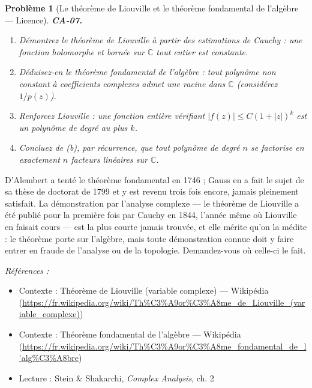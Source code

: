 \documentclass[11pt]{article}
\newtheorem{problem}{Problème}
\newenvironment{refs}{\par\small\noindent\emph{Références :}\begin{itemize}\setlength\itemsep{0pt}}{\end{itemize}\normalsize}
\begin{document}
\begin{problem}[{Le théorème de Liouville et le théorème fondamental de l'algèbre --- Licence}]
\textbf{CA-07.} \begin{enumerate}
\item[(a)] Démontrez le théorème de Liouville à partir des estimations de Cauchy :
une fonction holomorphe et bornée sur $ \mathbb{C} $ tout entier est constante.
\item[(b)] Déduisez-en le
théorème fondamental de l'algèbre : tout polynôme non constant à coefficients complexes admet une
racine dans $ \mathbb{C} $ (considérez $ 1/p(z) $).
\item[(c)] Renforcez Liouville : une fonction entière
vérifiant $ |f(z)| \le C(1 + |z|)^k $ est un polynôme de degré au plus $ k $.
\item[(d)] Concluez
de (b), par récurrence, que tout polynôme de degré $ n $ se factorise en exactement $ n $
facteurs linéaires sur $ \mathbb{C} $.
\end{enumerate}

\end{problem}

\noindent D'Alembert a tenté le théorème fondamental en 1746 ; Gauss en a fait le sujet de
sa thèse de doctorat de 1799 et y est revenu trois fois encore, jamais pleinement satisfait. La
démonstration par l'analyse complexe --- le théorème de Liouville a été publié pour la première fois
par Cauchy en 1844, l'année même où Liouville en faisait cours --- est la plus courte jamais trouvée,
et elle mérite qu'on la médite : le théorème porte sur l'algèbre, mais toute démonstration connue
doit y faire entrer en fraude de l'analyse ou de la topologie. Demandez-vous où celle-ci le
fait.

\begin{refs}
\item Contexte : Théorème de Liouville (variable complexe) --- Wikipédia (\url{https://fr.wikipedia.org/wiki/Th%C3%A9or%C3%A8me_de_Liouville_(variable_complexe)})
\item Contexte : Théorème fondamental de l'algèbre --- Wikipédia (\url{https://fr.wikipedia.org/wiki/Th%C3%A9or%C3%A8me_fondamental_de_l'alg%C3%A8bre})
\item Lecture : Stein \& Shakarchi, \textit{Complex Analysis}, ch. 2
\end{refs}

\bigskip
\end{document}
